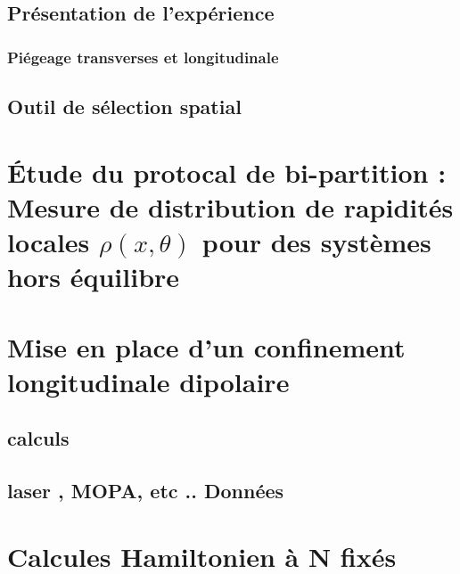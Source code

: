 \section{Présentation de l’expérience}

\subsection{Piégeage transverses et longitudinale}
\section{Outil de sélection spatial}


\chapter{Étude du protocal de bi-partition : Mesure de distribution de rapidités locales $\rho(x , \theta ) $  pour des systèmes hors équilibre}
\minitoc


\chapter{Mise en place d'un confinement longitudinale dipolaire}
\minitoc
\section{calculs}







\section{laser , MOPA, etc .. Données}

\appendix

\chapter{Calcules Hamiltonien à N fixés}
